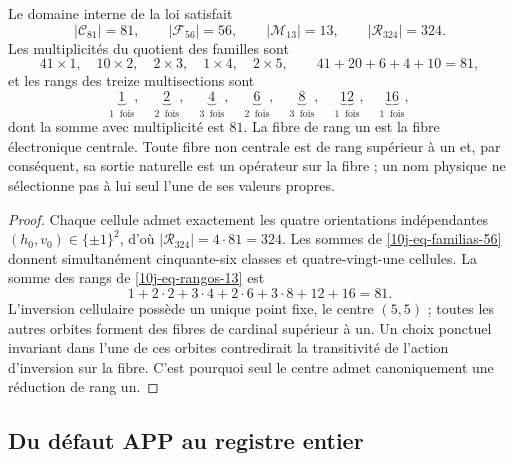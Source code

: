 \begin{theorem}
\label{10j-thm-dominio}
Le domaine interne de la loi satisfait
\begin{equation}
 |\mathcal C_{81}|=81,
 \qquad |\mathcal F_{56}|=56,
 \qquad |\mathcal M_{13}|=13,
 \qquad |\mathcal R_{324}|=324.
 \label{10j-eq-censo-dominio}
\end{equation}
Les multiplicités du quotient des familles sont
\begin{equation}
 41\times1,\quad10\times2,\quad2\times3,\quad1\times4,\quad2\times5,
 \qquad 41+20+6+4+10=81,
 \label{10j-eq-familias-56}
\end{equation}
et les rangs des treize multisections sont
\begin{equation}
 \underbrace{1}_{1\ \text{ fois}},\quad
 \underbrace{2}_{2\ \text{ fois}},\quad
 \underbrace{4}_{3\ \text{ fois}},\quad
 \underbrace{6}_{2\ \text{ fois}},\quad
 \underbrace{8}_{3\ \text{ fois}},\quad
 \underbrace{12}_{1\ \text{ fois}},\quad
 \underbrace{16}_{1\ \text{ fois}},
 \label{10j-eq-rangos-13}
\end{equation}
dont la somme avec multiplicité est \(81\). La fibre de rang un est la fibre
électronique centrale. Toute fibre non centrale est de rang supérieur à un et, par
conséquent, sa sortie naturelle est un opérateur sur la fibre ; un nom physique ne
sélectionne pas à lui seul l'une de ses valeurs propres.
\end{theorem}

\begin{proof}
Chaque cellule admet exactement les quatre orientations indépendantes
\((h_0,v_0)\in\{\pm1\}^2\), d'où
\(|\mathcal R_{324}|=4\cdot81=324\). Les sommes de
\eqref{10j-eq-familias-56} donnent simultanément cinquante-six classes et
quatre-vingt-une cellules. La somme des rangs de \eqref{10j-eq-rangos-13} est
\[
 1+2\cdot2+3\cdot4+2\cdot6+3\cdot8+12+16=81.
\]
L'inversion cellulaire possède un unique point fixe, le centre \((5,5)\) ; toutes les autres orbites forment des fibres de cardinal supérieur à un. Un choix ponctuel invariant dans l'une de ces orbites contredirait la transitivité de l'action d'inversion sur la fibre. C'est pourquoi seul le centre admet canoniquement une réduction de rang un.
\end{proof}

\subsection{Du défaut APP au registre entier}

